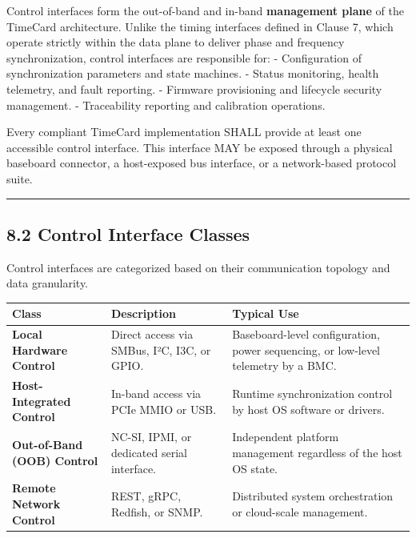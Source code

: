 Control interfaces form the out-of-band and in-band \textbf{management
plane} of the TimeCard architecture. Unlike the timing interfaces
defined in Clause 7, which operate strictly within the data plane to
deliver phase and frequency synchronization, control interfaces are
responsible for: - Configuration of synchronization parameters and state
machines. - Status monitoring, health telemetry, and fault reporting. -
Firmware provisioning and lifecycle security management. - Traceability
reporting and calibration operations.

Every compliant TimeCard implementation SHALL provide at least one
accessible control interface. This interface MAY be exposed through a
physical baseboard connector, a host-exposed bus interface, or a
network-based protocol suite.

\begin{center}\rule{0.5\linewidth}{0.5pt}\end{center}

\subsection{8.2 Control Interface
Classes}\label{control-interface-classes}

Control interfaces are categorized based on their communication topology
and data granularity.

{\def\LTcaptype{none} %
\begin{longtable}[]{@{}
  >{\raggedright\arraybackslash}p{}
  >{\raggedright\arraybackslash}p{}
  >{\raggedright\arraybackslash}p{}@{}}
\toprule\noalign{}
\begin{minipage}[b]{\linewidth}\raggedright
Class
\end{minipage} & \begin{minipage}[b]{\linewidth}\raggedright
Description
\end{minipage} & \begin{minipage}[b]{\linewidth}\raggedright
Typical Use
\end{minipage} \\
\midrule\noalign{}
\endhead
\bottomrule\noalign{}
\endlastfoot
\textbf{Local Hardware Control} & Direct access via SMBus, I²C, I3C, or
GPIO. & Baseboard-level configuration, power sequencing, or low-level
telemetry by a BMC. \\
\textbf{Host-Integrated Control} & In-band access via PCIe MMIO or USB.
& Runtime synchronization control by host OS software or drivers. \\
\textbf{Out-of-Band (OOB) Control} & NC-SI, IPMI, or dedicated serial
interface. & Independent platform management regardless of the host OS
state. \\
\textbf{Remote Network Control} & REST, gRPC, Redfish, or SNMP. &
Distributed system orchestration or cloud-scale management. \\
\end{longtable}
}

